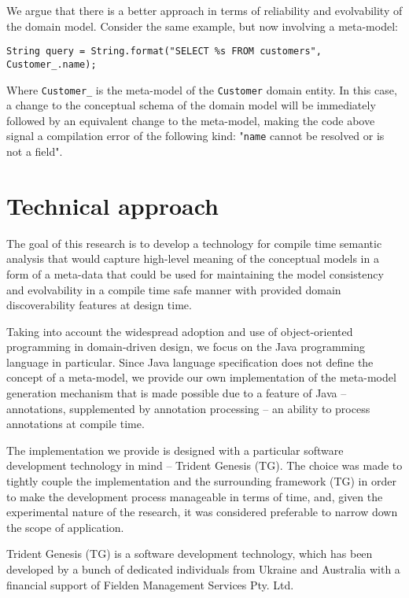 \n

We argue that there is a better approach in terms of reliability and evolvability of the domain model. Consider the same example, but now involving a meta-model:

\begin{verbatim}
String query = String.format("SELECT %s FROM customers", Customer_.name);
\end{verbatim}

Where \texttt{Customer\_} is the meta-model of the \texttt{Customer} domain entity. In this case, a change to the conceptual schema of the domain model will be immediately followed by an equivalent change to the meta-model, making the code above signal a compilation error of the following kind:
"\texttt{name} cannot be resolved or is not a field".

\section{Technical approach}

The goal of this research is to develop a technology for compile time semantic analysis that would capture high-level meaning of the conceptual models in a form of a meta-data that could be used for maintaining the model consistency and evolvability in a compile time safe manner with provided domain discoverability features at design time.

\n

Taking into account the widespread adoption and use of object-oriented programming in domain-driven design, we focus on the Java programming language in particular. Since Java language specification does not define the concept of a meta-model, we provide our own implementation of the meta-model generation mechanism that is made possible due to a feature of Java – annotations, supplemented by annotation processing -- an ability to process annotations at compile time.

\n

The implementation we provide is designed with a particular software development technology in mind – Trident Genesis (TG). The choice was made to tightly couple the implementation and the surrounding framework (TG) in order to make the development process manageable in terms of time, and, given the experimental nature of the research, it was considered preferable to narrow down the scope of application.

\n

Trident Genesis (TG) is a software development technology, which has been developed by a bunch of dedicated individuals from Ukraine and Australia with a financial support of Fielden Management Services Pty. Ltd.

